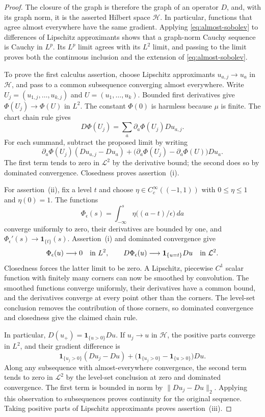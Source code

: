 \documentclass[11pt]{article}
\numberwithin{equation}{section}
\theoremstyle{definition}
\theoremstyle{remark}
\begin{document}
\begin{proof}
The closure of the graph is therefore the graph of an operator $D$,
and, with its graph norm, it is the asserted Hilbert space $\mathcal H$.
In particular, functions that agree almost everywhere have the same
gradient.  Applying \eqref{eq:almost-sobolev} to differences of
Lipschitz approximants shows that a graph-norm Cauchy sequence is
Cauchy in $L^p$.  Its $L^p$ limit agrees with its $L^2$ limit, and
passing to the limit proves both the continuous inclusion and the
extension of \eqref{eq:almost-sobolev}.

To prove the first calculus assertion, choose Lipschitz approximants
$u_{a,j}\to u_a$ in $\mathcal H$, and pass to a common subsequence converging
almost everywhere.  Write $U_j=(u_{1,j},\ldots,u_{k,j})$ and
$U=(u_1,\ldots,u_k)$.  Bounded first derivatives give
$\Phi(U_j)\to\Phi(U)$ in $L^2$.  The constant $\Phi(0)$ is harmless
because $\mu$ is finite.  The chart chain rule gives
\[
 D\Phi(U_j)=\sum_a\partial_a\Phi(U_j)Du_{a,j}.
\]
For each summand, subtract the proposed limit by writing
\[
 \partial_a\Phi(U_j)(Du_{a,j}-Du_a)
 +\bigl(\partial_a\Phi(U_j)-\partial_a\Phi(U)\bigr)Du_a.
\]
The first term tends to zero in $\mathcal L^2$ by the derivative
bound; the second does so by dominated convergence.  Closedness
proves assertion~\textup{(i)}.

For assertion~\textup{(ii)}, fix a level $t$ and choose
$\eta\in C_c^\infty((-1,1))$ with $0\le\eta\le1$ and $\eta(0)=1$.
The functions
\[
 \Phi_\epsilon(s)=\int_{-\infty}^s
                  \eta\bigl((a-t)/\epsilon\bigr)\,da
\]
converge uniformly to zero, their derivatives are bounded by one,
and $\Phi_\epsilon'(s)\to\mathbf1_{\{t\}}(s)$.  Assertion~\textup{(i)}
and dominated convergence give
\[
 \Phi_\epsilon(u)\longrightarrow0\quad\hbox{in }L^2,
 \qquad
 D\Phi_\epsilon(u)\longrightarrow\mathbf1_{\{u=t\}}Du
 \quad\hbox{in }\mathcal L^2.
\]
Closedness forces the latter limit to be zero.  A Lipschitz,
piecewise $C^1$ scalar function with finitely many corners can now be
smoothed by convolution.  The smoothed functions converge uniformly,
their derivatives have a common bound, and the derivatives converge
at every point other than the corners.  The level-set conclusion
removes the contribution of those corners, so dominated convergence
and closedness give the claimed chain rule.

In particular, $D(u_+)=\mathbf1_{\{u>0\}}Du$.  If $u_j\to u$ in
$\mathcal H$, the positive parts converge in $L^2$, and their gradient
difference is
\[
 \mathbf1_{\{u_j>0\}}(Du_j-Du)
 +\bigl(\mathbf1_{\{u_j>0\}}-\mathbf1_{\{u>0\}}\bigr)Du.
\]
Along any subsequence with almost-everywhere convergence, the second
term tends to zero in $\mathcal L^2$ by the level-set conclusion at
zero and dominated convergence.  The first term is bounded in norm
by $\|Du_j-Du\|_2$.  Applying this observation to subsequences proves
continuity for the original sequence.  Taking positive parts of
Lipschitz approximants proves assertion~\textup{(iii)}.


\end{proof}
\end{document}
